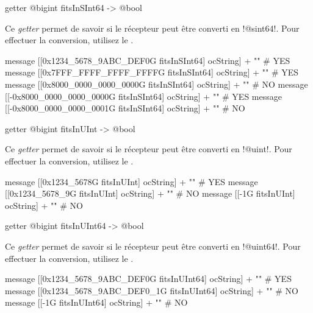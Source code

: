 
\begin{galgas}
getter @bigint fitsInSInt64 -> @bool
\end{galgas}

Ce \emph{getter} permet de savoir si le récepteur peut être converti en \ggs!@sint64!. Pour effectuer la conversion, utilisez le .

\begin{galgas}
message [[0x1234_5678_9ABC_DEF0G fitsInSInt64] ocString] + "\n" # YES
message [[0x7FFF_FFFF_FFFF_FFFFG fitsInSInt64] ocString] + "\n" # YES
message [[0x8000_0000_0000_0000G fitsInSInt64] ocString] + "\n" # NO
message [[-0x8000_0000_0000_0000G fitsInSInt64] ocString] + "\n" # YES
message [[-0x8000_0000_0000_0001G fitsInSInt64] ocString] + "\n" # NO
\end{galgas}





\begin{galgas}
getter @bigint fitsInUInt -> @bool
\end{galgas}

Ce \emph{getter} permet de savoir si le récepteur peut être converti en \ggs!@uint!. Pour effectuer la conversion, utilisez le .

\begin{galgas}
message [[0x1234_5678G fitsInUInt] ocString] + "\n" # YES
message [[0x1234_5678_9G fitsInUInt] ocString] + "\n" # NO
message [[-1G fitsInUInt] ocString] + "\n" # NO
\end{galgas}







\begin{galgas}
getter @bigint fitsInUInt64 -> @bool
\end{galgas}

Ce \emph{getter} permet de savoir si le récepteur peut être converti en \ggs!@uint64!. Pour effectuer la conversion, utilisez le .

\begin{galgas}
message [[0x1234_5678_9ABC_DEF0G fitsInUInt64] ocString] + "\n" # YES
message [[0x1234_5678_9ABC_DEF0_1G fitsInUInt64] ocString] + "\n" # NO
message [[-1G fitsInUInt64] ocString] + "\n" # NO
\end{galgas}


